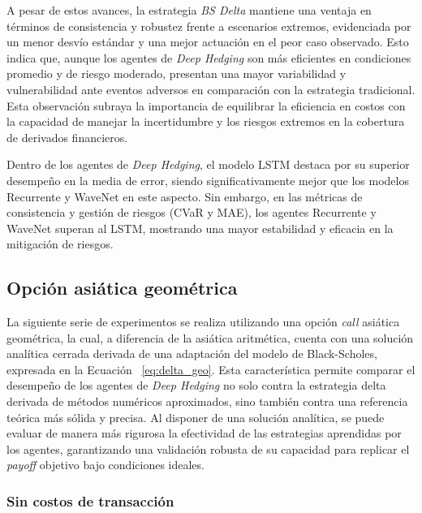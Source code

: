 \documentclass[11pt,a4paper,spanish]{article}
\numberwithin{equation}{section} %
\begin{document}
A pesar de estos avances, la estrategia \textit{BS Delta} mantiene una ventaja en términos de consistencia y robustez frente a escenarios extremos, evidenciada por un menor desvío estándar y una mejor actuación en el peor caso observado. Esto indica que, aunque los agentes de \textit{Deep Hedging} son más eficientes en condiciones promedio y de riesgo moderado, presentan una mayor variabilidad y vulnerabilidad ante eventos adversos en comparación con la estrategia tradicional. Esta observación subraya la importancia de equilibrar la eficiencia en costos con la capacidad de manejar la incertidumbre y los riesgos extremos en la cobertura de derivados financieros.

Dentro de los agentes de \textit{Deep Hedging}, el modelo LSTM destaca por su superior desempeño en la media de error, siendo significativamente mejor que los modelos Recurrente y WaveNet en este aspecto. Sin embargo, en las métricas de consistencia y gestión de riesgos (CVaR y MAE), los agentes Recurrente y WaveNet superan al LSTM, mostrando una mayor estabilidad y eficacia en la mitigación de riesgos.

\subsection{Opción asiática geométrica}

La siguiente serie de experimentos se realiza utilizando una opción \textit{call} asiática geométrica, la cual, a diferencia de la asiática aritmética, cuenta con una solución analítica cerrada derivada de una adaptación del modelo de Black-Scholes, expresada en la Ecuación ~\ref{eq:delta_geo}. Esta característica permite comparar el desempeño de los agentes de \textit{Deep Hedging} no solo contra la estrategia delta derivada de métodos numéricos aproximados, sino también contra una referencia teórica más sólida y precisa. Al disponer de una solución analítica, se puede evaluar de manera más rigurosa la efectividad de las estrategias aprendidas por los agentes, garantizando una validación robusta de su capacidad para replicar el \textit{payoff} objetivo bajo condiciones ideales.

\subsubsection{Sin costos de transacción}
\end{document}

